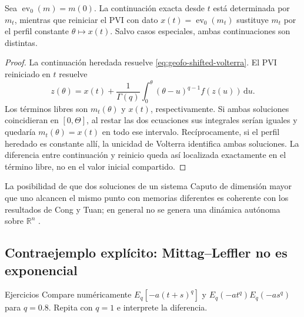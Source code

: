 \begin{proposition}
Sea \(\operatorname{ev}_0(m)=m(0)\). La continuación exacta desde \(t\) está
determinada por \(m_t\), mientras que reiniciar el PVI con dato
\(x(t)=\operatorname{ev}_0(m_t)\) sustituye \(m_t\) por el perfil constante
\(\theta\mapsto x(t)\). Salvo casos especiales, ambas continuaciones son
distintas.
\end{proposition}

\begin{proof}
La continuación heredada resuelve \cref{eq:geofo-shifted-volterra}. El PVI
reiniciado en \(t\) resuelve
\begin{equation}
 z(\theta)=x(t)+\frac1{\Gamma(q)}
 \int_0^\theta(\theta-u)^{q-1}f(z(u))\,\mathrm du.
 \label{eq:geofo-reset-volterra}
\end{equation}
Los términos libres son \(m_t(\theta)\) y \(x(t)\), respectivamente.
Si ambas soluciones coincidieran en \([0,\Theta]\), al restar las dos
ecuaciones sus integrales serían iguales y quedaría
\(m_t(\theta)=x(t)\) en todo ese intervalo. Recíprocamente, si el perfil
heredado es constante allí, la unicidad de Volterra identifica ambas
soluciones. La diferencia entre continuación y reinicio queda así localizada
exactamente en el término libre, no en el valor inicial compartido.
\end{proof}

La posibilidad de que dos soluciones de un sistema Caputo de dimensión mayor
que uno alcancen el mismo punto con memorias diferentes es coherente con los
resultados de Cong y Tuan; en general no se genera una dinámica autónoma sobre
\(\mathbb R^n\) \cite{CongTuan2017Nonlocal}.



\subsection{Contraejemplo explícito: Mittag--Leffler no es exponencial}

\ifHAFOPedagogy
\begin{bloqueestudio}{Ejercicios}
Compare numéricamente
\(E_q[-a(t+s)^q]\) y \(E_q(-at^q)E_q(-as^q)\) para \(q=0.8\).
Repita con \(q=1\) e interprete la diferencia.
\end{bloqueestudio}
\fi

